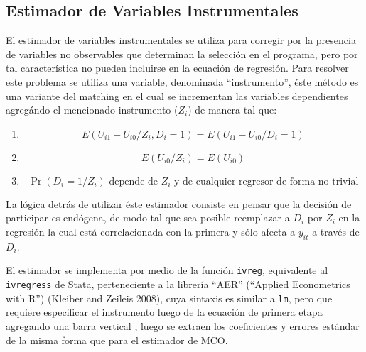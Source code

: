 \documentclass[]{article}
\newenvironment{Shaded}{\begin{snugshade}}{\end{snugshade}}
\newcommand{\KeywordTok}[1]{\textcolor[rgb]{0.13,0.29,0.53}{\textbf{{#1}}}}
\newcommand{\DataTypeTok}[1]{\textcolor[rgb]{0.13,0.29,0.53}{{#1}}}
\newcommand{\DecValTok}[1]{\textcolor[rgb]{0.00,0.00,0.81}{{#1}}}
\newcommand{\CommentTok}[1]{\textcolor[rgb]{0.56,0.35,0.01}{\textit{{#1}}}}
\newcommand{\NormalTok}[1]{{#1}}
\begin{document}
\begin{Shaded}
\end{Shaded}

\subsection{Estimador de Variables
Instrumentales}\label{estimador-de-variables-instrumentales}

El estimador de variables instrumentales se utiliza para corregir por la
presencia de variables no observables que determinan la selección en el
programa, pero por tal característica no pueden incluirse en la ecuación
de regresión. Para resolver este problema se utiliza una variable,
denominada ``instrumento'', éste método es una variante del matching en
el cual se incrementan las variables dependientes agregándo el
mencionado instrumento ($Z_{i}$) de manera tal que:

\begin{enumerate}
\def\labelenumi{\arabic{enumi}.}
\itemsep1pt\parskip0pt
\item
  \[ E(U_{i1}-U_{i0}/Z_{i}, D_{i}=1)=E(U_{i1}-U_{i0}/ D_{i}=1) \]
\item
  \[ E(U_{i0}/Z_{i})=E(U_{i0}) \]
\item
  \[ \Pr(D_{i}=1/Z_{i}) \text{ depende de $Z_{i}$ y de cualquier regresor de forma no trivial} \]
\end{enumerate}

La lógica detrás de utilizar éste estimador consiste en pensar que la
decisión de participar es endógena, de modo tal que sea posible
reemplazar a $D_{i}$ por $Z_{i}$ en la regresión la cual está
correlacionada con la primera y sólo afecta a $y_{it}$ a través de
$D_{i}$.

El estimador se implementa por medio de la función \texttt{ivreg},
equivalente al \texttt{ivregress} de Stata, perteneciente a la librería
``AER'' (``Applied Econometrics with R'') (Kleiber and Zeileis 2008),
cuya sintaxis es similar a \texttt{lm}, pero que requiere especificar el
instrumento luego de la ecuación de primera etapa agregando una barra
vertical \texttt{\textbar{}}, luego se extraen los coeficientes y
errores estándar de la misma forma que para el estimador de MCO.
\end{document}
